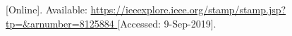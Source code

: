\begin{thebibliography}{9}

[Online]. Available:
\url{
https://ieeexplore.ieee.org/stamp/stamp.jsp?tp=&arnumber=8125884
}
[Accessed: 9-Sep-2019].





































\end{thebibliography}